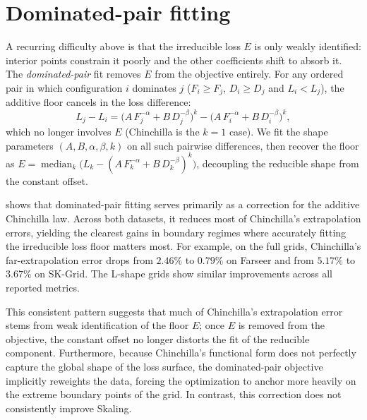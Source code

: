 \documentclass[]{fairmeta}
\newcommand{\ska}{Skaling}
\begin{document}
\section{Dominated-pair fitting}
\label{app:dompair}
A recurring difficulty above is that the irreducible loss $E$ is only weakly identified: interior points constrain it poorly and the other coefficients shift to absorb it. The \emph{dominated-pair} fit removes $E$ from the objective entirely. For any ordered pair in which configuration $i$ dominates $j$ ($F_i\ge F_j$, $D_i\ge D_j$ and $L_i<L_j$), the additive floor cancels in the loss difference:
\begin{equation}\label{eq:dompair}
L_j-L_i=\big(A\,F_j^{-\alpha}+B\,D_j^{-\beta}\big)^{k}-\big(A\,F_i^{-\alpha}+B\,D_i^{-\beta}\big)^{k},
\end{equation}
which no longer involves $E$ (Chinchilla is the $k{=}1$ case). We fit the shape parameters $(A,B,\alpha,\beta,k)$ on all such pairwise differences, then recover the floor as $E=\operatorname{median}_k\big(L_k-(A\,F_k^{-\alpha}+B\,D_k^{-\beta})^{k}\big)$, decoupling the reducible shape from the constant offset.

 shows that dominated-pair fitting serves primarily as a correction for the additive Chinchilla law. Across both datasets, it reduces most of Chinchilla's extrapolation errors, yielding the clearest gains in boundary regimes where accurately fitting the irreducible loss floor matters most. For example, on the full grids, Chinchilla's far-extrapolation error drops from $2.46\%$ to $0.79\%$ on Farseer and from $5.17\%$ to $3.67\%$ on SK-Grid. The L-shape grids show similar improvements across all reported metrics. 

This consistent pattern suggests that much of Chinchilla's extrapolation error stems from weak identification of the floor $E$; once $E$ is removed from the objective, the constant offset no longer distorts the fit of the reducible component. Furthermore, because Chinchilla's functional form does not perfectly capture the global shape of the loss surface, the dominated-pair objective implicitly reweights the data, forcing the optimization to anchor more heavily on the extreme boundary points of the grid. In contrast, this correction does not consistently improve \ska{}.
\end{document}
